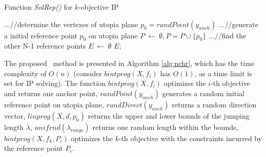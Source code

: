 \begin{algorithm}[t]                  %
\caption{Function \small{\emph{SolRep()}} for $k$-objective IP}\label{alg:nchr}
\small
    $ ...$//determine the vertexes of utopia plane\; \label{algo:nchr:i3}
    $p_{0} = randPoint(y_{anch})$\; \label{algo:nchr:i4}
    $ ...$//generate a initial reference point $p_0$ on utopia plane\; \label{algo:nchr:i5}
    $P~\leftarrow~\emptyset, P = P \cup \{p_{0}\}$\; \label{algo:nchr:i6}
    $ ...$//find the other N-1 reference points\; \label{algo:nchr:i13}
    $E~\leftarrow~\emptyset$\; \label{algo:nchr:i14}
    \KwRet $E$;\label{algo:cwmoip:rt}

\end{algorithm}

The proposed \ourSol~method is presented in Algorithm \ref{alg:nchr}, which has the time complexity of $O(n)$ (consider $bintprog(X,f_{i})$ has $O(1)$, as a time limit is set for IP solving). The function $bintprog(X,f_{i})$ optimizes the $i$-th objective and returns one anchor point, $randPoint(y_{anch})$ generates a random initial reference point on utopia plane, $randDirect(y_{anch})$ returns a random direction vector, $linprog(X,d,p_{0})$ returns the upper and lower bounds of the jumping length $\lambda$, $unifrnd(\lambda_{range})$ returns one random length within the bounds, $bintprog(X,f_{k},P_{i})$ optimizes the $k$-th objective with the constraints incurred by the reference point $P_{i}$.

